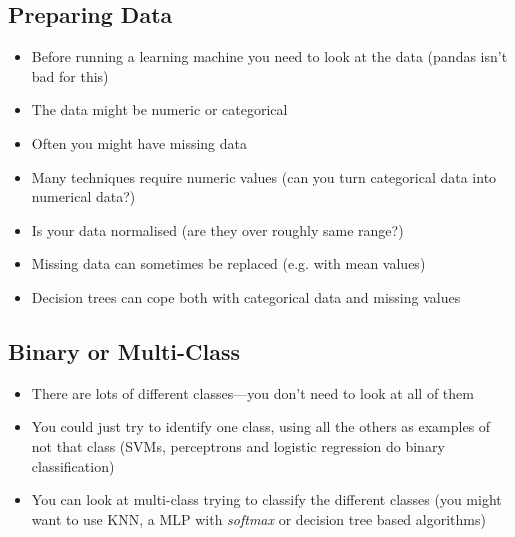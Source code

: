 \begin{slide}
\section[-2]{Preparing Data}
  
\begin{PauseHighLight}
  \begin{itemize}
  \item Before running a learning machine you need to look at the data
    (pandas isn't bad for this)\pause
  \item The data might be numeric or categorical\pause
  \item Often you might have missing data\pause
  \item Many techniques require numeric values (can you turn categorical
    data into numerical data?)\pause
  \item Is your data normalised (are they over roughly same range?)\pause
  \item Missing data can sometimes be replaced (e.g. with mean
    values)\pause
  \item Decision trees can cope both with categorical data and missing
    values\pause 
  \end{itemize}
\end{PauseHighLight}

\end{slide}



\begin{slide}
\section{Binary or Multi-Class}

\begin{PauseHighLight}
  \begin{itemize}
  \item There are lots of different classes\pause---you don't need to
    look at all of them\pause
  \item You could just try to identify one class, using all the others
    as examples of not that class (SVMs, perceptrons and logistic
    regression do binary classification)\pause
  \item You can look at multi-class trying to classify the different
    classes (you might want to use KNN, a MLP with \textit{softmax} or
    decision tree based algorithms)\pause
  \end{itemize}
\end{PauseHighLight}

\end{slide}

